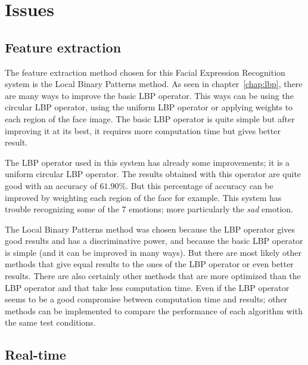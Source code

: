\chapter{Issues}
\label{chap:eval_issues}

\section{Feature extraction}

\vspace{\baselineskip}
\noindent The feature extraction method chosen for this Facial Expression Recognition system is the Local Binary Patterns method. As seen in chapter~\ref{chap:lbp}, there are many ways to improve the basic LBP operator. This ways can be using the circular LBP operator, using the uniform LBP operator or applying weights to each region of the face image. The basic LBP operator is quite simple but after improving it at its best, it requires more computation time but gives better result.
\newline

\noindent The LBP operator used in this system has already some improvements; it is a uniform circular LBP operator. The results obtained with this operator are quite good with an accuracy of $ 61.90\% $. But this percentage of accuracy can be improved by weighting each region of the face for example. This system has trouble recognizing some of the 7 emotions; more particularly the \textit{sad} emotion.
\newline

\noindent The Local Binary Patterns method was chosen because the LBP operator gives good results and has a discriminative power, and because the basic LBP operator is simple (and it can be improved in many ways). But there are most likely other methods that give equal results to the ones of the LBP operator or even better results. There are also certainly other methods that are more optimized than the LBP operator and that take less computation time. Even if the LBP operator seems to be a good compromise between computation time and results; other methods can be implemented to compare the performance of each algorithm with the same test conditions.
\newline

\section{Real-time}

